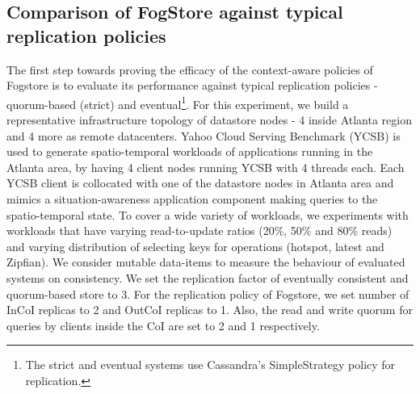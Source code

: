 \subsection{Comparison of FogStore against typical replication policies}
The first step towards proving the efficacy of the context-aware policies of Fogstore is to evaluate its performance against typical replication policies - quorum-based (strict) and eventual\footnote{The strict and eventual systems use Cassandra's SimpleStrategy policy for replication.}. 
For this experiment, we build a representative infrastructure topology of datastore nodes - 4 inside Atlanta region and 4 more as remote datacenters. Yahoo Cloud Serving Benchmark (YCSB) is used to generate spatio-temporal workloads of applications running in the Atlanta area, by having 4 client nodes running YCSB with 4 threads each. Each YCSB client is collocated with one of the datastore nodes in Atlanta area and mimics a situation-awareness application component making queries to the spatio-temporal state. To cover a wide variety of workloads, we experiments with workloads that have varying read-to-update ratios (20\%, 50\% and 80\% reads) and varying distribution of selecting keys for operations (hotspot, latest and Zipfian). We consider mutable data-items to measure the behaviour of evaluated systems on consistency. We set the replication factor of eventually consistent and quorum-based store to 3. For the replication policy of Fogstore, we set number of InCoI replicas to 2 and OutCoI replicas to 1. Also, the read and write quorum for queries by clients inside the CoI are set to 2 and 1 respectively. 

